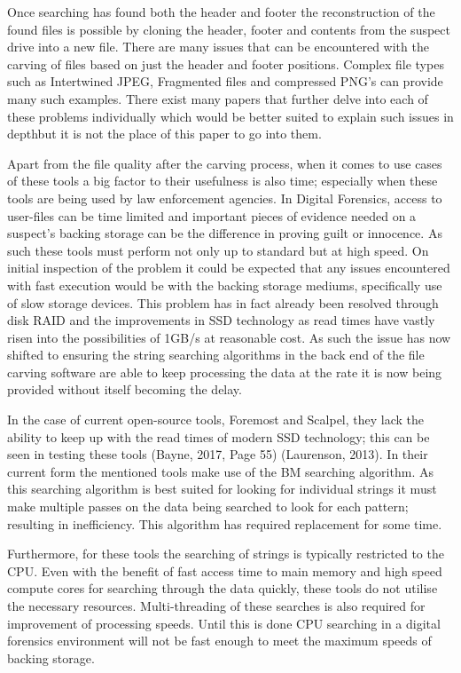 Once searching has found both the header and footer the reconstruction of the found files is possible by cloning the header, footer and contents from the suspect drive into a new file.
There are many issues that can be encountered with the carving of files based on just the header and footer positions.
Complex file types such as Intertwined JPEG, Fragmented files and compressed PNG’s can provide many such examples.
There exist many papers that further delve into each of these problems individually which would be better suited to explain such issues in depth\footnotemark but it is not the place of this paper to go into them.

Apart from the file quality after the carving process, when it comes to use cases of these tools a big factor to their usefulness is also time; especially when these tools are being used by law enforcement agencies.
In Digital Forensics, access to user-files can be time limited and important pieces of evidence needed on a suspect's backing storage can be the difference in proving guilt or innocence.
As such these tools must perform not only up to standard but at high speed.
On initial inspection of the problem it could be expected that any issues encountered with fast execution would be with the backing storage mediums, specifically use of slow storage devices.
This problem has in fact already been resolved through disk RAID and the improvements in \ac{SSD} technology as read times have vastly risen into the possibilities of 1\ac{GB}/s at reasonable cost.
As such the issue has now shifted to ensuring the string searching algorithms in the back end of the file carving software are able to keep processing the data at the rate it is now being provided without itself becoming the delay.

In the case of current open-source tools, Foremost and Scalpel, they lack the ability to keep up with the read times of modern \ac{SSD} technology; this can be seen in testing these tools (Bayne, 2017, Page 55) (Laurenson, 2013).
In their current form the mentioned tools make use of the \acf{BM} searching algorithm.
As this searching algorithm is best suited for looking for individual strings it must make multiple passes on the data being searched to look for each pattern; resulting in inefficiency.
This algorithm has required replacement for some time.

Furthermore, for these tools the searching of strings is typically restricted to the \ac{CPU}.
Even with the benefit of fast access time to main memory and high speed compute cores for searching through the data quickly, these tools do not utilise the necessary resources.
Multi-threading of these searches is also required for improvement of processing speeds.
Until this is done \ac{CPU} searching in a digital forensics environment will not be fast enough to meet the maximum speeds of backing storage.

